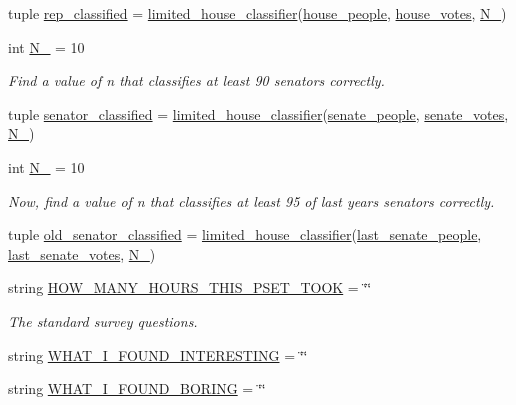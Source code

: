 \begin{DoxyCompactItemize}
tuple \hyperlink{namespacelab4_a0a6d77c441ad0d92c2505978d09d00b6}{rep\+\_\+classified} = \hyperlink{namespacelab4_afeb6f3043e63aad7e472bc70ac32b8cc}{limited\+\_\+house\+\_\+classifier}(\hyperlink{namespacelab4_aa3012299c849f02ae31ae12757cf2f47}{house\+\_\+people}, \hyperlink{namespacelab4_aaf99ce787c94a9fc9d4d77942cf300c3}{house\+\_\+votes}, \hyperlink{namespacelab4_a950de6b6a30b3a64b09305c0a1f52990}{N\+\_})
\item 
int \hyperlink{namespacelab4_a35d81e5aba299c0a383ad648ed879fa8}{N\+\_} = 10
\begin{DoxyCompactList}\small\item\em Find a value of n that classifies at least 90 senators correctly. \end{DoxyCompactList}\item 
tuple \hyperlink{namespacelab4_a6fd54c2b5b11a8c2578c2777a6f47a35}{senator\+\_\+classified} = \hyperlink{namespacelab4_afeb6f3043e63aad7e472bc70ac32b8cc}{limited\+\_\+house\+\_\+classifier}(\hyperlink{namespacelab4_ab431969dcbdc497ed29f78787174f64b}{senate\+\_\+people}, \hyperlink{namespacelab4_ac5205d0d5639e598abd827580ff7f6ce}{senate\+\_\+votes}, \hyperlink{namespacelab4_a35d81e5aba299c0a383ad648ed879fa8}{N\+\_})
\item 
int \hyperlink{namespacelab4_af4fa52415c905938ba3e0b76e2b57196}{N\+\_} = 10
\begin{DoxyCompactList}\small\item\em Now, find a value of n that classifies at least 95 of last year\textquotesingle{}s senators correctly. \end{DoxyCompactList}\item 
tuple \hyperlink{namespacelab4_a085a485c7a948fb548fb294216b560bc}{old\+\_\+senator\+\_\+classified} = \hyperlink{namespacelab4_afeb6f3043e63aad7e472bc70ac32b8cc}{limited\+\_\+house\+\_\+classifier}(\hyperlink{namespacelab4_a1ede50f42a59bf83d5c09c3aef93c234}{last\+\_\+senate\+\_\+people}, \hyperlink{namespacelab4_a7770c32cb0f0983cb6ae508b479e7a6d}{last\+\_\+senate\+\_\+votes}, \hyperlink{namespacelab4_af4fa52415c905938ba3e0b76e2b57196}{N\+\_})
\item 
string \hyperlink{namespacelab4_a603179138a7ff56fcea1a59347d8154c}{H\+O\+W\+\_\+\+M\+A\+N\+Y\+\_\+\+H\+O\+U\+R\+S\+\_\+\+T\+H\+I\+S\+\_\+\+P\+S\+E\+T\+\_\+\+T\+O\+O\+K} = \char`\"{}\char`\"{}
\begin{DoxyCompactList}\small\item\em The standard survey questions. \end{DoxyCompactList}\item 
string \hyperlink{namespacelab4_ae3a183ad2ccdafaeb81264d2e04a7e71}{W\+H\+A\+T\+\_\+\+I\+\_\+\+F\+O\+U\+N\+D\+\_\+\+I\+N\+T\+E\+R\+E\+S\+T\+I\+N\+G} = \char`\"{}\char`\"{}
\item 
string \hyperlink{namespacelab4_a9ef9abf2d634215662582c7fae76fb2e}{W\+H\+A\+T\+\_\+\+I\+\_\+\+F\+O\+U\+N\+D\+\_\+\+B\+O\+R\+I\+N\+G} = \char`\"{}\char`\"{}
\end{DoxyCompactItemize}


